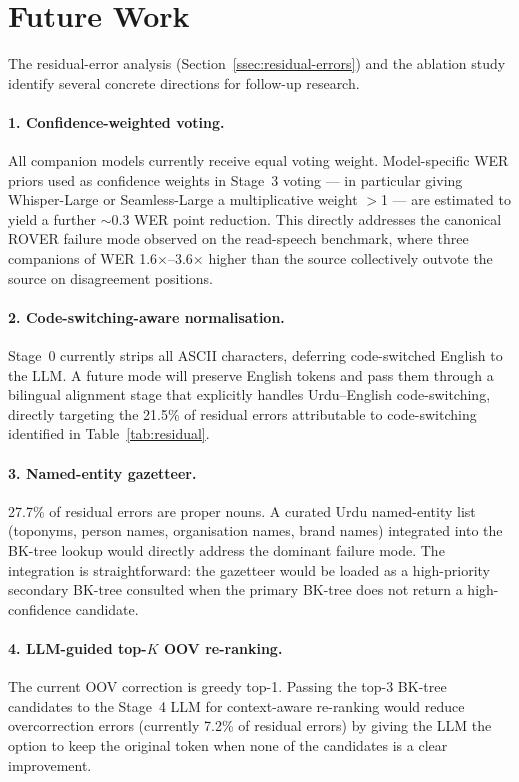 \section{Future Work}
\label{sec:future-work}

The residual-error analysis (Section~\ref{ssec:residual-errors}) and the ablation study identify several concrete directions for follow-up research.

\paragraph{1. Confidence-weighted voting.}
All companion models currently receive equal voting weight. Model-specific WER priors used as confidence weights in Stage~3 voting --- in particular giving Whisper-Large or Seamless-Large a multiplicative weight $>$1 --- are estimated to yield a further $\sim$0.3 WER point reduction. This directly addresses the canonical ROVER failure mode observed on the read-speech benchmark, where three companions of WER 1.6$\times$--3.6$\times$ higher than the source collectively outvote the source on disagreement positions.

\paragraph{2. Code-switching-aware normalisation.}
Stage~0 currently strips all ASCII characters, deferring code-switched English to the LLM. A future mode will preserve English tokens and pass them through a bilingual alignment stage that explicitly handles Urdu--English code-switching, directly targeting the 21.5\% of residual errors attributable to code-switching identified in Table~\ref{tab:residual}.

\paragraph{3. Named-entity gazetteer.}
27.7\% of residual errors are proper nouns. A curated Urdu named-entity list (toponyms, person names, organisation names, brand names) integrated into the BK-tree lookup would directly address the dominant failure mode. The integration is straightforward: the gazetteer would be loaded as a high-priority secondary BK-tree consulted when the primary BK-tree does not return a high-confidence candidate.

\paragraph{4. LLM-guided top-$K$ OOV re-ranking.}
The current OOV correction is greedy top-1. Passing the top-3 BK-tree candidates to the Stage~4 LLM for context-aware re-ranking would reduce overcorrection errors (currently 7.2\% of residual errors) by giving the LLM the option to keep the original token when none of the candidates is a clear improvement.

